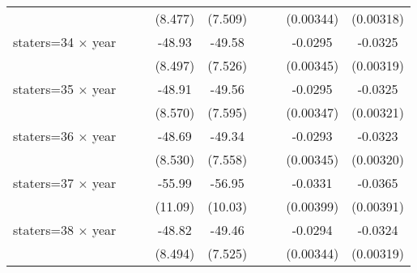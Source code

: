 {\begin{longtable}{l*{8}{c}}
                    &                     &                     &     (8.477)         &     (7.509)         &                     &                     &   (0.00344)         &   (0.00318)         \\
[1em]
staters=34 $\times$ year&                     &                     &      -48.93\sym{***}&      -49.58\sym{***}&                     &                     &     -0.0295\sym{***}&     -0.0325\sym{***}\\
                    &                     &                     &     (8.497)         &     (7.526)         &                     &                     &   (0.00345)         &   (0.00319)         \\
[1em]
staters=35 $\times$ year&                     &                     &      -48.91\sym{***}&      -49.56\sym{***}&                     &                     &     -0.0295\sym{***}&     -0.0325\sym{***}\\
                    &                     &                     &     (8.570)         &     (7.595)         &                     &                     &   (0.00347)         &   (0.00321)         \\
[1em]
staters=36 $\times$ year&                     &                     &      -48.69\sym{***}&      -49.34\sym{***}&                     &                     &     -0.0293\sym{***}&     -0.0323\sym{***}\\
                    &                     &                     &     (8.530)         &     (7.558)         &                     &                     &   (0.00345)         &   (0.00320)         \\
[1em]
staters=37 $\times$ year&                     &                     &      -55.99\sym{***}&      -56.95\sym{***}&                     &                     &     -0.0331\sym{***}&     -0.0365\sym{***}\\
                    &                     &                     &     (11.09)         &     (10.03)         &                     &                     &   (0.00399)         &   (0.00391)         \\
[1em]
staters=38 $\times$ year&                     &                     &      -48.82\sym{***}&      -49.46\sym{***}&                     &                     &     -0.0294\sym{***}&     -0.0324\sym{***}\\
                    &                     &                     &     (8.494)         &     (7.525)         &                     &                     &   (0.00344)         &   (0.00319)         \\

\end{longtable}}
